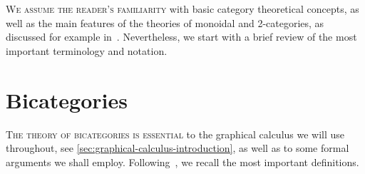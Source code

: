 \textsc{We assume the reader's familiarity}
with basic category theoretical concepts,
as well as the main features of the theories of monoidal and 2-categories,
as discussed for example in~\cite{MacLane1998,Etingof2015,category-theory-in-context_riehl,johnson-yau2021:TwoDimensionalCategories}.
Nevertheless, we start with a brief review of the most important terminology and notation.

\section{Bicategories}\label{sec:bicategories}

\textsc{The theory of bicategories is essential}
to the graphical calculus we will use throughout,
see \cref{sec:graphical-calculus-introduction},
as well as to some formal arguments we shall employ.
Following~\cite{johnson-yau2021:TwoDimensionalCategories},
we recall the most important definitions.

